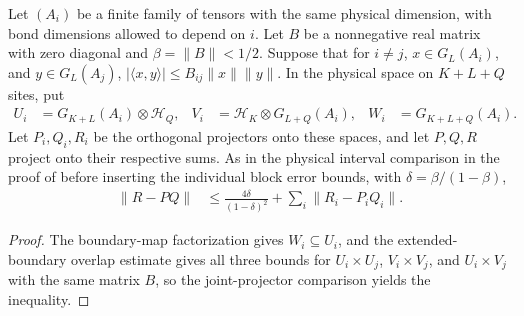 \begin{lemma}
    \label{thm:ph_block_interval_projectors}
    \leanok
    Let $(A_i)$ be a finite family of tensors with the same physical dimension,
    with bond dimensions allowed to depend on $i$. Let $B$ be a nonnegative
    real matrix with zero diagonal and $\beta=\lVert B\rVert<1/2$.
    Suppose that for $i\ne j$, $x\in G_L(A_i)$, and $y\in G_L(A_j)$,
    $|\langle x,y\rangle|\leq B_{ij}\lVert x\rVert\lVert y\rVert$.
    In the physical space on $K+L+Q$ sites, put
    \begin{align}
        U_i & =G_{K+L}(A_i)\otimes\mathcal H_Q,  &
        V_i & =\mathcal H_K\otimes G_{L+Q}(A_i), &
        W_i & =G_{K+L+Q}(A_i).
    \end{align}
    Let $P_i,Q_i,R_i$ be the orthogonal projectors onto these spaces, and let
    $P,Q,R$ project onto their respective sums. As in the physical interval
    comparison in the proof of \cite[Lemma~6.1(ii)]{Nachtergaele1996Spectral}
    before inserting the individual block error bounds, with
    $\delta=\beta/(1-\beta)$,
    \begin{align}
        \lVert R-PQ\rVert & \leq\frac{4\delta}{(1-\delta)^2}
        +\sum_i\lVert R_i-P_iQ_i\rVert.
    \end{align}
\end{lemma}
\begin{proof}
    \leanok
    The boundary-map factorization gives $W_i\subseteq U_i$, and
    the extended-boundary overlap estimate gives all three bounds for
    $U_i\times U_j$, $V_i\times V_j$, and $U_i\times V_j$ with the same
    matrix $B$, so the joint-projector comparison yields the inequality.
\end{proof}

